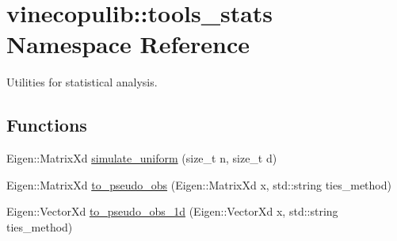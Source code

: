 \hypertarget{namespacevinecopulib_1_1tools__stats}{}\section{vinecopulib\+:\+:tools\+\_\+stats Namespace Reference}
\label{namespacevinecopulib_1_1tools__stats}


Utilities for statistical analysis.  


\subsection*{Functions}
\begin{DoxyCompactItemize}
\item 
Eigen\+::\+Matrix\+Xd \hyperlink{namespacevinecopulib_1_1tools__stats_a78efaf3caf538201cdb881dd2780b242}{simulate\+\_\+uniform} (size\+\_\+t n, size\+\_\+t d)
\item 
Eigen\+::\+Matrix\+Xd \hyperlink{namespacevinecopulib_1_1tools__stats_afda41507cee7cba84602e28e56cfcd99}{to\+\_\+pseudo\+\_\+obs} (Eigen\+::\+Matrix\+Xd x, std\+::string ties\+\_\+method)
\item 
Eigen\+::\+Vector\+Xd \hyperlink{namespacevinecopulib_1_1tools__stats_a9e4849a2a908703a68e92e0c0633237f}{to\+\_\+pseudo\+\_\+obs\+\_\+1d} (Eigen\+::\+Vector\+Xd x, std\+::string ties\+\_\+method)
\end{DoxyCompactItemize}
